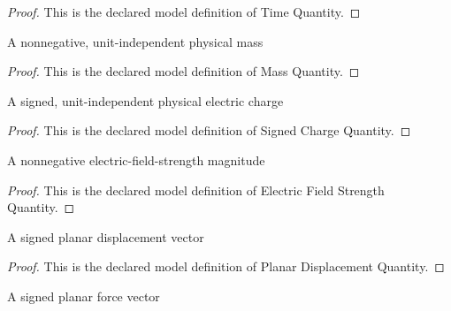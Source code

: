 \begin{proof}
  This is the declared model definition of Time Quantity.
\end{proof}
\begin{definition}
  \label{def:physics:phyx-mini-0837:phyxminiproblems-problemphyxmini0837-massquantity}
  A nonnegative, unit-independent physical mass
\end{definition}
\begin{proof}
  This is the declared model definition of Mass Quantity.
\end{proof}
\begin{definition}
  \label{def:physics:phyx-mini-0837:phyxminiproblems-problemphyxmini0837-signedchargequantity}
  A signed, unit-independent physical electric charge
\end{definition}
\begin{proof}
  This is the declared model definition of Signed Charge Quantity.
\end{proof}
\begin{definition}
  \label{def:physics:phyx-mini-0837:phyxminiproblems-problemphyxmini0837-electricfieldstrengthquantity}
  A nonnegative electric-field-strength magnitude
\end{definition}
\begin{proof}
  This is the declared model definition of Electric Field Strength Quantity.
\end{proof}
\begin{definition}
  \label{def:physics:phyx-mini-0837:phyxminiproblems-problemphyxmini0837-planardisplacementquantity}
  A signed planar displacement vector
\end{definition}
\begin{proof}
  This is the declared model definition of Planar Displacement Quantity.
\end{proof}
\begin{definition}
  \label{def:physics:phyx-mini-0837:phyxminiproblems-problemphyxmini0837-planarforcequantity}
  A signed planar force vector
\end{definition}

